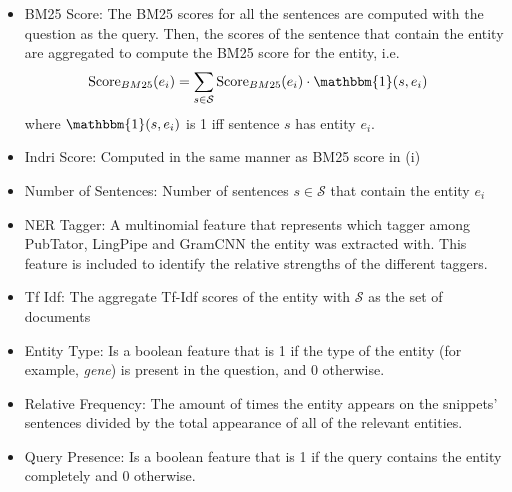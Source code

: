 \documentclass[11pt,a4paper]{article}
\begin{document}
\begin{itemize}[noitemsep]
    \item BM25 Score: The BM25 scores for all the sentences are computed with the question as the query. Then, the scores of the sentence that contain the entity are aggregated to compute the BM25 score for the entity, i.e.
    \begin{align*}
        \text{Score}_{BM25}(e_i) &= \sum_{s \in \mathcal{S}} \text{Score}_{BM25}(e_i) \cdot \mathbbm{1}(s, e_i)
    \end{align*}
    where $\mathbbm{1}(s, e_i)$ is 1 iff sentence $s$ has entity $e_i$.
    \item Indri Score: Computed in the same manner as BM25 score in (i)
    \item Number of Sentences: Number of sentences $s \in \mathcal{S}$ that contain the entity $e_i$
    \item NER Tagger: A multinomial feature that represents which tagger among PubTator, LingPipe and GramCNN the entity was extracted with. This feature is included to identify the relative strengths of the different taggers.
    \item Tf Idf: The aggregate Tf-Idf scores of the entity with $\mathcal{S}$ as the set of documents
    \item Entity Type: Is a boolean feature that is 1 if the type of the entity (for example, \textit{gene}) is present in the question, and 0 otherwise.
    \item Relative Frequency: The amount of times the entity appears on the snippets' sentences divided by the total appearance of all of the relevant entities.
    \item Query Presence: Is a boolean feature that is 1 if the query contains the entity completely and 0 otherwise.

\end{itemize}
\end{document}
